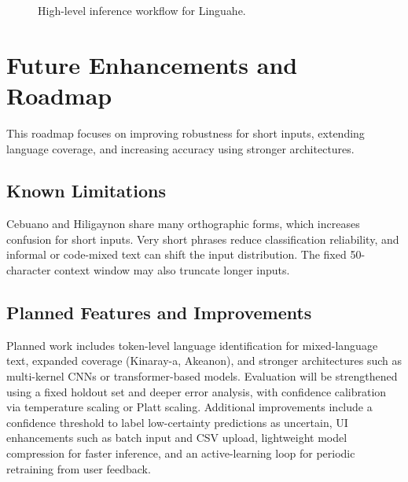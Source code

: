 \documentclass[conference]{IEEEtran}
\begin{document}
\begin{figure}[t]
\centering
{}
\caption{High-level inference workflow for Linguahe.}
\label{fig:workflow}
\end{figure}

\section{Future Enhancements and Roadmap}
This roadmap focuses on improving robustness for short inputs, extending language coverage, and increasing accuracy using stronger architectures.
\subsection{Known Limitations}
Cebuano and Hiligaynon share many orthographic forms, which increases confusion for short inputs. Very short phrases reduce classification reliability, and informal or code-mixed text can shift the input distribution. The fixed 50-character context window may also truncate longer inputs.

\subsection{Planned Features and Improvements}
Planned work includes token-level language identification for mixed-language text, expanded coverage (Kinaray-a, Akeanon), and stronger architectures such as multi-kernel CNNs or transformer-based models. Evaluation will be strengthened using a fixed holdout set and deeper error analysis, with confidence calibration via temperature scaling or Platt scaling. Additional improvements include a confidence threshold to label low-certainty predictions as uncertain, UI enhancements such as batch input and CSV upload, lightweight model compression for faster inference, and an active-learning loop for periodic retraining from user feedback.
\end{document}
